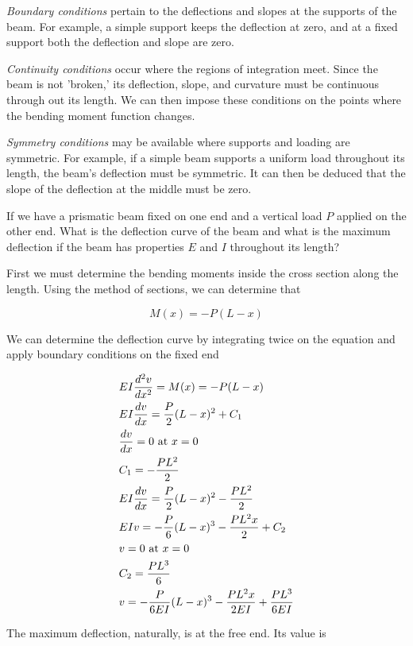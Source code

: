 \documentclass[a4paper,openany,12pt]{book}
\begin{document}
\begin{enumerate}
\emph{Boundary conditions} pertain to the deflections and slopes at the
supports of the beam. For example, a simple support keeps the deflection
at zero, and at a fixed support both the deflection and slope are zero.

\emph{Continuity conditions} occur where the regions of integration meet.
Since the beam is not 'broken,' its deflection, slope, and curvature
must be continuous through out its length. We can then impose these
conditions on the points where the bending moment function changes.

\emph{Symmetry conditions} may be available where supports and loading are
symmetric. For example, if a simple beam supports a uniform load
throughout its length, the beam's deflection must be symmetric. It can
then be deduced that the slope of the deflection at the middle must be
zero.

If we have a prismatic beam fixed on one end and a vertical load \(P\)
applied on the other end. What is the deflection curve of the beam and
what is the maximum deflection if the beam has properties \(E\) and \(I\)
throughout its length?


First we must determine the bending moments inside the cross section
along the length. Using the method of sections, we can determine that

$$M(x) =  - P(L - x)$$

We can determine the deflection curve by integrating twice on the
equation and apply boundary conditions on the fixed end

$$\begin{gathered}
  EI\frac{d^2v}{dx^2} = M(x) =  - P(L - x) \hfill \\
  EI\frac{dv}{dx} = \frac{P}{2}(L - x)^2 + C_1 \hfill \\
  \frac{dv}{dx} = 0\text{ at }x = 0 \hfill \\
  C_1 =  -\frac{PL^2}{2} \hfill \\
  EI\frac{dv}{dx} = \frac{P}{2}(L - x)^2 - \frac{PL^2}{2} \hfill \\
  EIv =  -\frac{P}{6}(L - x)^3 -\frac{PL^2x}{2} + C_2 \hfill \\
  v = 0\text{ at }x = 0 \hfill \\
  C_2 = \frac{PL^3}{6} \hfill \\
  v =  -\frac{P}{6EI}(L - x)^3 -\frac{PL^2x}{2EI} + \frac{PL^3}{6EI} \hfill \\ 
\end{gathered}$$

The maximum deflection, naturally, is at the free end. Its value is


\end{enumerate}
\end{document}
